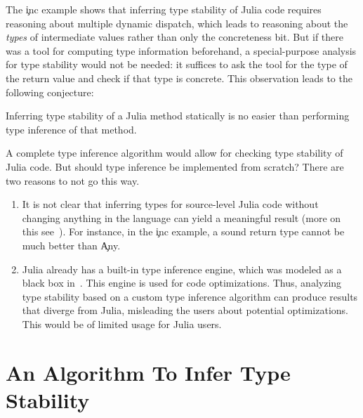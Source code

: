 The \c{inc} example shows that inferring type stability of Julia code
requires
reasoning about %
multiple dynamic dispatch, which leads
to reasoning about the \emph{types} of intermediate values rather than only
the concreteness bit. But if there was a tool for computing type information
beforehand, a special-purpose analysis for type stability would not be needed: 
it suffices to ask the tool for the type of the return value and
check if that type is concrete. 
This observation leads to the following conjecture:

\begin{conjecture}
  Inferring type stability of a Julia method statically is no easier than
  performing type inference of that method.
\end{conjecture}

A complete type inference algorithm would allow for checking type stability of
Julia code. But should type inference be implemented from scratch? There are two reasons to
not go this way.
\begin{enumerate}

  \item It is not clear that inferring types for source-level Julia code
  without changing anything in the language
  can yield a meaningful result (more on this see~\cite{Chung23}).
  For instance, in the \c{inc} example, a sound return type cannot be
  much better than \c{Any}.

  \item Julia already has a built-in type inference engine, which 
    was modeled as a black box in~. 
    This engine is used for code optimizations. 
    Thus, analyzing type stability based on a custom type inference 
    algorithm 
    can produce results that diverge from Julia, misleading the users
    about potential optimizations.
    This would be of limited usage for Julia users.
\end{enumerate}

\section{An Algorithm To Infer Type Stability}%
\label{sec:approx:algo}

